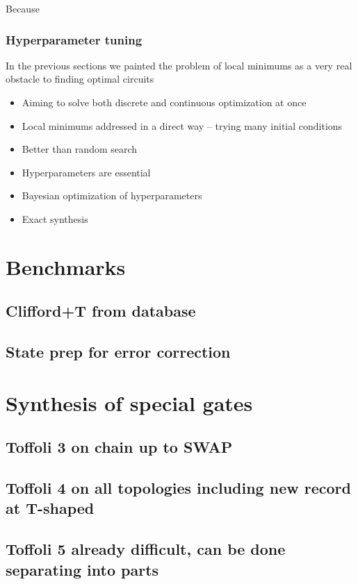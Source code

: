 \documentclass[amsfonts, amssymb, aps, nofootinbib]{revtex4-2}
\begin{document}
Because
\subsubsection{Hyperparameter tuning}






In the previous sections we painted the problem of local minimums as a very real obstacle to finding optimal circuits

\begin{itemize}
	\item Aiming to solve both discrete and continuous optimization at once
	\item Local minimums addressed in a direct way -- trying many initial conditions
	\item Better than random search
	\item Hyperparameters are essential
	\item Bayesian optimization of hyperparameters
	\item Exact synthesis
\end{itemize}
\section{Benchmarks}
\subsection{Clifford+T from database}
\subsection{State prep for error correction}
\section{Synthesis of special gates}
\subsection{Toffoli 3 on chain up to SWAP}
\subsection{Toffoli 4 on all topologies including new record at T-shaped}
\subsection{Toffoli 5 already difficult, can be done separating into parts}


\end{document}
